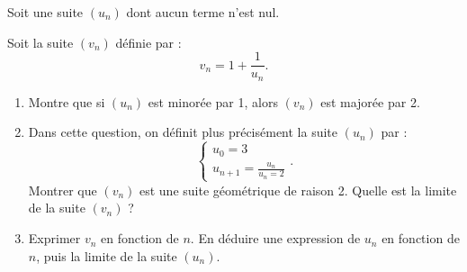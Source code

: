 \begin{question}[topic=suites]
  Soit une suite $(u_n)$ dont aucun terme n'est nul.

  Soit la suite $(v_n)$ définie par : \[ v_n = 1 + \frac{1}{u_n} . \]
  \begin{enumerate}
    \item Montre que si $(u_n)$ est minorée par 1, alors $(v_n)$ est majorée
      par 2.
    \item Dans cette question, on définit plus précisément la suite $(u_n)$
      par : \[ \begin{cases} u_0 = 3 \\ u_{n+1} = \frac{u_n}{u_n = 2}
      \end{cases} . \] Montrer que $(v_n)$ est une suite géométrique de
      raison 2. Quelle est la limite de la suite $(v_n)$ ?
    \item Exprimer $v_n$ en fonction de $n$. En déduire une expression de
      $u_n$ en fonction de $n$, puis la limite de la suite $(u_n)$.
  \end{enumerate}
\end{question}

